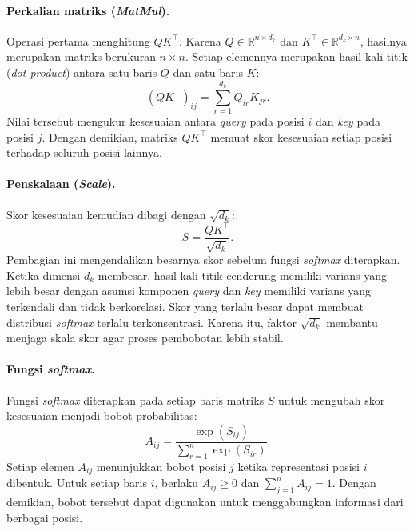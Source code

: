 \paragraph{Perkalian matriks (\textit{MatMul}).}
Operasi pertama menghitung $QK^\top$. Karena
$Q\in\mathbb{R}^{n\times d_k}$ dan
$K^\top\in\mathbb{R}^{d_k\times n}$, hasilnya merupakan matriks
berukuran $n\times n$. Setiap elemennya merupakan hasil kali titik
(\textit{dot product}) antara satu baris $Q$ dan satu baris $K$:
\begin{equation}
(QK^\top)_{ij}
=
\sum_{r=1}^{d_k}Q_{ir}K_{jr}.
\label{eq:atensi-matmul}
\end{equation}
Nilai tersebut mengukur kesesuaian antara \textit{query} pada posisi $i$
dan \textit{key} pada posisi $j$. Dengan demikian, matriks $QK^\top$
memuat skor kesesuaian setiap posisi terhadap seluruh posisi
lainnya.

\paragraph{Penskalaan (\textit{Scale}).}
Skor kesesuaian kemudian dibagi dengan $\sqrt{d_k}$:
\begin{equation}
S=\frac{QK^\top}{\sqrt{d_k}}.
\label{eq:atensi-scale}
\end{equation}
Pembagian ini mengendalikan besarnya skor sebelum fungsi
\textit{softmax} diterapkan. Ketika dimensi $d_k$ membesar,
hasil kali titik cenderung memiliki varians yang lebih besar
dengan asumsi komponen \textit{query} dan \textit{key} memiliki varians yang
terkendali dan tidak berkorelasi. Skor yang terlalu besar dapat
membuat distribusi \textit{softmax} terlalu terkonsentrasi.
Karena itu, faktor $\sqrt{d_k}$ membantu menjaga skala skor
agar proses pembobotan lebih stabil.

\paragraph{Fungsi \textit{softmax}.}
Fungsi \textit{softmax} diterapkan pada setiap baris matriks $S$
untuk mengubah skor kesesuaian menjadi bobot probabilitas:
\begin{equation}
A_{ij}
=
\frac{\exp(S_{ij})}
{\sum_{r=1}^{n}\exp(S_{ir})}.
\label{eq:atensi-softmax}
\end{equation}
Setiap elemen $A_{ij}$ menunjukkan bobot posisi $j$ ketika
representasi posisi $i$ dibentuk. Untuk setiap baris $i$,
berlaku $A_{ij}\geq 0$ dan $\sum_{j=1}^{n}A_{ij}=1$.
Dengan demikian, bobot tersebut dapat digunakan untuk
menggabungkan informasi dari berbagai posisi.

